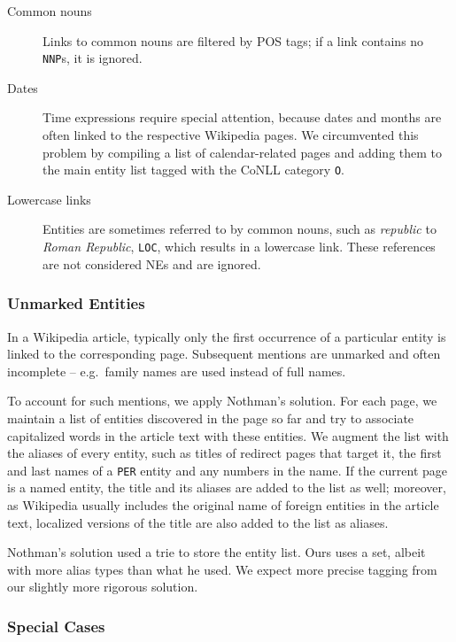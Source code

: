 \documentclass[11pt]{article}
\begin{document}
\begin{description}
\item[Common nouns] Links to common nouns are filtered by POS tags; if a link contains no \texttt{NNP}s, it is ignored.
\item[Dates] Time expressions require special attention, because dates and months are often linked to the respective Wikipedia pages. We circumvented this problem by compiling a list of calendar-related pages and adding them to the main entity list tagged with the CoNLL category \texttt{O}. 
\item[Lowercase links] Entities are sometimes referred to by common nouns, such as \textit{republic} to \textit{Roman Republic}, \texttt{LOC}, which results in a lowercase link. These references are not considered NEs and are ignored.
\end{description}

\subsubsection{Unmarked Entities}

In a Wikipedia article, typically only the first occurrence of a particular entity is linked to the corresponding page. Subsequent mentions are unmarked and often incomplete -- e.g.~family names are used instead of full names.

To account for such mentions, we apply Nothman's  solution. For each page, we maintain a list of entities discovered in the page so far and try to associate capitalized words in the article text with these entities. We augment the list with the aliases of every entity, such as titles of redirect pages that target it, the first and last names of a \texttt{PER} entity and any numbers in the name. If the current page is a named entity, the title and its aliases are added to the list as well; moreover, as Wikipedia usually includes the original name of foreign entities in the article text, localized versions of the title are also added to the list as aliases.

Nothman's solution used a trie to store the entity list. Ours uses a set, albeit with more alias types than what he used. We expect more precise tagging from our slightly more rigorous solution.

\subsubsection{Special Cases}
\end{document}
